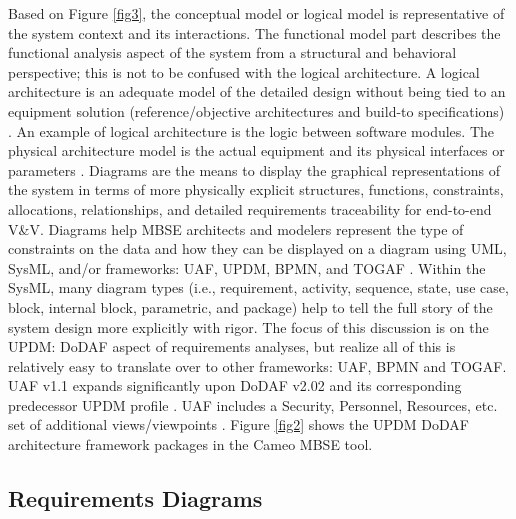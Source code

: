 \documentclass[num-refs]{wiley-article}
\begin{document}
Based on Figure \ref{fig3}, the conceptual model or logical model is representative of the system context and its interactions. The functional model part describes the functional analysis aspect of the system from a structural and behavioral perspective; this is not to be confused with the logical architecture. A logical architecture is an adequate model of the detailed design without being tied to an equipment solution (reference/objective architectures and build-to specifications) \cite{Ieee15288_2015}. An example of logical architecture is the logic between software modules. The physical architecture model is the actual equipment and its physical interfaces or parameters \cite{Morkevicius2014}. Diagrams are the means to display the graphical representations of the system in terms of more physically explicit structures, functions, constraints, allocations, relationships, and detailed requirements traceability for end-to-end V\&V. Diagrams help MBSE architects and modelers represent the type of constraints on the data and how they can be displayed on a diagram using UML, SysML, and/or frameworks: UAF, UPDM, BPMN, and TOGAF \cite{Friedenthal2008}. Within the SysML, many diagram types (i.e., requirement, activity, sequence, state, use case, block, internal block, parametric, and package) help to tell the full story of the system design more explicitly with rigor. The focus of this discussion is on the UPDM: DoDAF aspect of requirements analyses, but realize all of this is relatively easy to translate over to other frameworks: UAF, BPMN and TOGAF. UAF v1.1 expands significantly upon DoDAF v2.02 and its corresponding predecessor UPDM profile \cite{ChiefInformationOfficer2010}. UAF includes a Security, Personnel, Resources, etc. set of additional views/viewpoints \cite{ChiefInformationOfficer2010}. Figure \ref{fig2} shows the UPDM DoDAF architecture framework packages in the Cameo MBSE tool.

\subsection{Requirements Diagrams}
\label{Requirements Diagrams}
\end{document}
